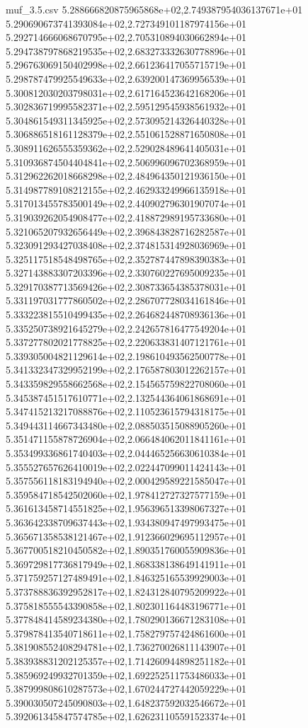 \begin{filecontents*}{muf_3.5.csv}
5.288666820875965868e+02,2.749387954036137671e+01
5.290690673741393084e+02,2.727349101187974156e+01
5.292714666068670795e+02,2.705310894030662894e+01
5.294738797868219535e+02,2.683273332630778896e+01
5.296763069150402998e+02,2.661236417055715719e+01
5.298787479925549633e+02,2.639200147369956539e+01
5.300812030203798031e+02,2.617164523642168206e+01
5.302836719995582371e+02,2.595129545938561932e+01
5.304861549311345925e+02,2.573095214326440328e+01
5.306886518161128379e+02,2.551061528871650808e+01
5.308911626555359362e+02,2.529028489641405031e+01
5.310936874504404841e+02,2.506996096702368959e+01
5.312962262018668298e+02,2.484964350121936150e+01
5.314987789108212155e+02,2.462933249966135918e+01
5.317013455783500149e+02,2.440902796301907074e+01
5.319039262054908477e+02,2.418872989195733680e+01
5.321065207932656449e+02,2.396843828716282587e+01
5.323091293427038408e+02,2.374815314928036969e+01
5.325117518548498765e+02,2.352787447898390383e+01
5.327143883307203396e+02,2.330760227695009235e+01
5.329170387713569426e+02,2.308733654385378031e+01
5.331197031777860502e+02,2.286707728034161846e+01
5.333223815510499435e+02,2.264682448708936136e+01
5.335250738921645279e+02,2.242657816477549204e+01
5.337277802021778825e+02,2.220633831407121761e+01
5.339305004821129614e+02,2.198610493562500778e+01
5.341332347329952199e+02,2.176587803012262157e+01
5.343359829558662568e+02,2.154565759822708060e+01
5.345387451517610771e+02,2.132544364061868691e+01
5.347415213217088876e+02,2.110523615794318175e+01
5.349443114667343480e+02,2.088503515088905260e+01
5.351471155878726904e+02,2.066484062011841161e+01
5.353499336861740403e+02,2.044465256630610384e+01
5.355527657626410019e+02,2.022447099011424143e+01
5.357556118183194940e+02,2.000429589221585047e+01
5.359584718542502060e+02,1.978412727327577159e+01
5.361613458714551825e+02,1.956396513398067327e+01
5.363642338709637443e+02,1.934380947497993475e+01
5.365671358538121467e+02,1.912366029695112957e+01
5.367700518210450582e+02,1.890351760055909836e+01
5.369729817736817949e+02,1.868338138649141911e+01
5.371759257127489491e+02,1.846325165539929003e+01
5.373788836392952817e+02,1.824312840795209922e+01
5.375818555543390858e+02,1.802301164483196771e+01
5.377848414589234380e+02,1.780290136671283108e+01
5.379878413540718611e+02,1.758279757424861600e+01
5.381908552408294781e+02,1.736270026811143907e+01
5.383938831202125357e+02,1.714260944898251182e+01
5.385969249932701359e+02,1.692252511753486033e+01
5.387999808610287573e+02,1.670244727442059229e+01
5.390030507245090803e+02,1.648237592032546672e+01
5.392061345847574785e+02,1.626231105591523374e+01

\end{filecontents*}
